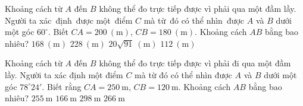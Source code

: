\begin{ex}%
	Khoảng cách từ $A$ đến $B$ không thể đo trực tiếp được vì phải qua một đầm lầy. Người ta xác định được một điểm $C$ mà từ đó có thể nhìn được $A$ và $B$ dưới một góc $60^\circ $. Biết $CA=200~\left(\mathrm{m}\right)$, $CB=180~\left(\mathrm{m}\right)$. Khoảng cách $AB$ bằng bao nhiêu?
	\choice
	{$168~\left(\mathrm{m}\right)$}
	{$228~\left(\mathrm{m}\right)$}
	{\True $20\sqrt{91}~\left(\mathrm{m}\right)$}
	{$112~\left(\mathrm{m}\right)$}
\end{ex}
\begin{ex}%
	Khoảng cách từ $A$ đến $B$ không thể đo trực tiếp được vì phải đi qua một đầm lầy. Người ta xác định một điểm $C$ mà từ đó có thể nhìn được $A$ và $B$ dưới một góc $78^\circ 24'$. Biết rằng $CA=250\mathrm{~m}$, $CB=120\mathrm{~m}$. Khoảng cách $AB$ bằng bao nhiêu?
	\choice
	{\True $255\mathrm{~m}$}
	{$166\mathrm{~m}$}
	{$298\mathrm{~m}$}
	{$266\mathrm{~m}$}
\end{ex}
